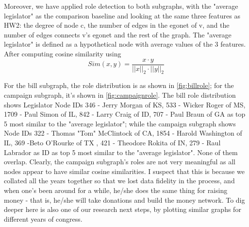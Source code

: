 \documentclass[12pt,twocolumn]{article}
\begin{document}
Moreover, we have applied role detection to both subgraphs, with the "average legislator" as the comparison baseline and looking at the same three features as HW2: the degree of node c, the number of edges in the egonet of v, and the number of edges connects v's egonet and the rest of the graph. The "average legislator" is defined as a hypothetical node with average values of the 3 features. After computing cosine similarity using $$Sim(x,y) = \frac{x\cdot{y}}{||x||_2 \cdot{||y||_2}}$$

For the bill subgraph, the role distribution is as shown in \ref{fig:billrole}; for the campaign subgraph, it's shown in \ref{fig:campaignrole}. The bill role distribution shows Legislator Node IDs {346 - Jerry Morgan of KS, 533 - Wicker Roger of MS, 1709 - Paul Simon of IL, 842 - Larry Craig of ID, 707 - Paul Braun of GA} as top 5 most similar to the "average legislator"; while the campaign subgraph shows Node IDs {322 - Thomas "Tom" McClintock of CA, 1854 - Harold Washington of IL, 369 -Beto O'Rourke of TX , 421 - Theodore Rokita of IN, 279 - Raul Labrador as ID} as top 5 most similar to the "average legislator". None of them overlap. Clearly, the campaign subgraph's roles are not very meaningful as all nodes appear to have similar cosine similarities. I suspect that this is because we collated all the years together so that we lost data fidelity in the process, and when one's been around for a while, he/she does the same thing for raising money - that is, he/she will take donations and build the money network. To dig deeper here is also one of our research next steps, by plotting similar graphs for different years of congress. 
\end{document}
